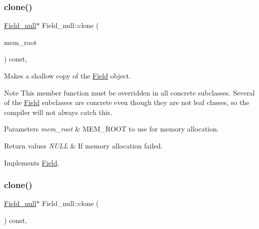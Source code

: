 \subsubsection{\texorpdfstring{clone()}{clone()}\hspace{0.1cm}{\footnotesize\ttfamily [1/2]}}
{\footnotesize\ttfamily \mbox{\hyperlink{classField__null}{Field\+\_\+null}}$\ast$ Field\+\_\+null\+::clone (\begin{DoxyParamCaption}\item[{M\+E\+M\+\_\+\+R\+O\+OT $\ast$}]{mem\+\_\+root }\end{DoxyParamCaption}) const\hspace{0.3cm}{\ttfamily [inline]}, {\ttfamily [virtual]}}

Makes a shallow copy of the \mbox{\hyperlink{classField}{Field}} object.

\begin{DoxyNote}{Note}
This member function must be overridden in all concrete subclasses. Several of the \mbox{\hyperlink{classField}{Field}} subclasses are concrete even though they are not leaf classes, so the compiler will not always catch this.
\end{DoxyNote}

\begin{DoxyParams}{Parameters}
{\em mem\+\_\+root} & M\+E\+M\+\_\+\+R\+O\+OT to use for memory allocation. \\
\hline
\end{DoxyParams}

\begin{DoxyRetVals}{Return values}
{\em N\+U\+LL} & If memory allocation failed. \\
\hline
\end{DoxyRetVals}


Implements \mbox{\hyperlink{classField_a64979bcb9345803b031fff76a0c3d9fe}{Field}}.

\mbox{\label{classField__null_a02b58c0585abc836acfe7b7a1bec8d61}} 
\subsubsection{\texorpdfstring{clone()}{clone()}\hspace{0.1cm}{\footnotesize\ttfamily [2/2]}}
{\footnotesize\ttfamily \mbox{\hyperlink{classField__null}{Field\+\_\+null}}$\ast$ Field\+\_\+null\+::clone (\begin{DoxyParamCaption}{ }\end{DoxyParamCaption}) const\hspace{0.3cm}{\ttfamily [inline]}, {\ttfamily [virtual]}}

